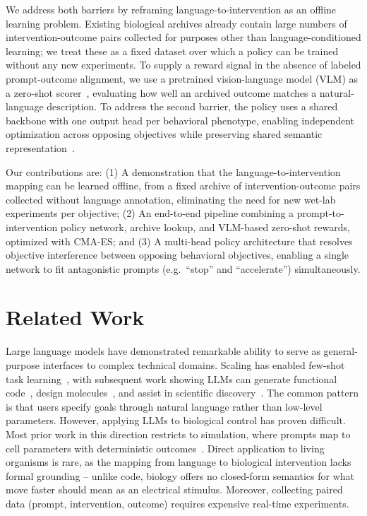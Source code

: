 \documentclass{article}
\begin{document}
We address both barriers by reframing language-to-intervention as an offline learning problem. Existing biological archives already contain large numbers of intervention-outcome pairs collected for purposes other than language-conditioned learning; we treat these as a fixed dataset over which a policy can be trained without any new experiments. To supply a reward signal in the absence of labeled prompt-outcome alignment, we use a pretrained vision-language model (VLM) as a zero-shot scorer~\cite{rocamonde2023vision}, evaluating how well an archived outcome matches a natural-language description. To address the second barrier, the policy uses a shared backbone with one output head per behavioral phenotype, enabling independent optimization across opposing objectives while preserving shared semantic representation~\cite{ruder2017overview}.


Our contributions are:
(1) A demonstration that the language-to-intervention mapping can be learned offline, from a fixed archive of intervention-outcome pairs collected without language annotation, eliminating the need for new wet-lab experiments per objective;
(2) An end-to-end pipeline combining a prompt-to-intervention policy network, archive lookup, and VLM-based zero-shot rewards, optimized with CMA-ES; and
(3) A multi-head policy architecture that resolves objective interference between opposing behavioral objectives, enabling a single network to fit antagonistic prompts (e.g.\ ``stop'' and ``accelerate'') simultaneously.

\section{Related Work}
\label{sec:related}

Large language models have demonstrated remarkable ability to serve as general-purpose interfaces to complex technical domains. Scaling has enabled few-shot task learning~\cite{brown2020language}, with subsequent work showing LLMs can generate functional code~\cite{chen2021evaluating}, design molecules~\cite{jumper2021highly}, and assist in scientific discovery~\cite{zheng2025large}. The common pattern is that users specify goals through natural language rather than low-level parameters. However, applying LLMs to biological control has proven difficult. Most prior work in this direction restricts to simulation, where prompts map to cell parameters with deterministic outcomes~\cite{Le2025zapgpt, le2025giving}. Direct application to living organisms is rare, as the mapping from language to biological intervention lacks formal grounding -- unlike code, biology offers no closed-form semantics for what move faster should mean as an electrical stimulus. Moreover, collecting paired data (prompt, intervention, outcome) requires expensive real-time experiments.
\end{document}
